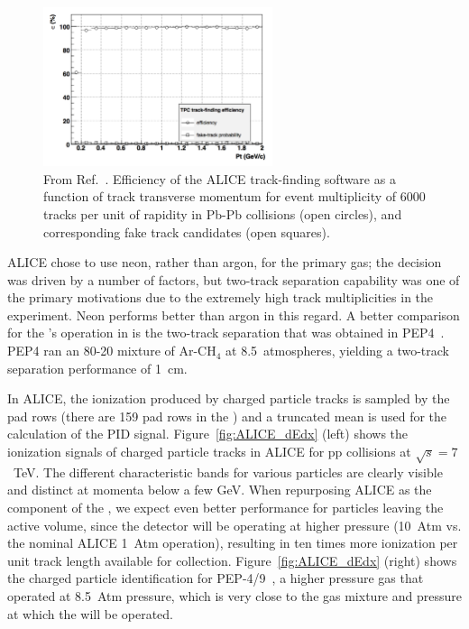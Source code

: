 \begin{figure}[h]
    \centering
    \includegraphics[width=0.6\textwidth]{graphics/ALICE_TPCreco.png}
    \caption{From Ref.~\cite{Alessandro:2006yt}. Efficiency of the ALICE  track-finding software as a function of track transverse momentum for event multiplicity of 6000 tracks per unit of rapidity in Pb-Pb collisions (open circles), and corresponding fake track candidates (open squares).}     
    \label{fig:ALICE_offlinereco} 
\end{figure}

ALICE chose to use neon, rather than argon, for the primary gas; the decision was driven by a number of factors, but two-track separation capability was one of the primary motivations due to the extremely high track multiplicities in the experiment.  Neon performs better than argon in this regard.  A better comparison for the 's operation in  is the two-track separation that was obtained in PEP4~\cite{PEP4_Stork}.  PEP4 ran an 80-20 mixture of Ar-CH$_4$ at 8.5~atmospheres, yielding a two-track separation performance of \SI{1}{cm}.

In ALICE, the ionization produced by charged particle tracks is sampled by the  pad rows (there are 159 pad rows in the ) and a truncated mean is used for the calculation of the PID signal. Figure~\ref{fig:ALICE_dEdx} (left) shows the ionization signals of charged particle tracks in ALICE for pp collisions at $\sqrt{s} = 7$~TeV. The different characteristic bands for various particles are clearly visible and distinct at momenta below a few GeV.  When repurposing ALICE as the  component of the , we expect even better performance for particles leaving the active volume, since the detector will be operating at higher pressure (10~Atm vs. the nominal ALICE 1~Atm operation), resulting in ten times more ionization per unit track length available for collection. Figure~\ref{fig:ALICE_dEdx} (right) shows the charged particle identification for PEP-4/9~\cite{Grupen:1999by}, a higher pressure gas  that operated at 8.5~Atm pressure, which is very close to the gas mixture and pressure at which the  will be operated.

